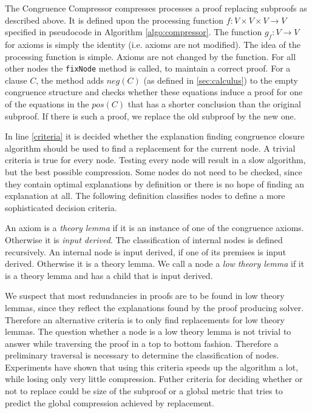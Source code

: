 The Congruence Compressor compresses processes a proof replacing subproofs as described above. 
It is defined upon the processing function $f: V \times V \times V \rightarrow V$ specified in pseudocode in Algorithm \ref{algo:compressor}.
The function $g_f: V \rightarrow V$ for axioms is simply the identity (i.e. axioms are not modified).
The idea of the processing function is simple.
Axioms are not changed by the function.
For all other nodes the \texttt{fixNode} method is called, to maintain a correct proof.
For a clause $C$, the method adds $neg(C)$ (as defined in \ref{sec:calculus}) to the empty congruence structure and checks whether these equations induce a proof for one of the equations in the $pos(C)$ that has a shorter conclusion than the original subproof.
If there is such a proof, we replace the old subproof by the new one.

In line \ref{criteria} it is decided whether the explanation finding congruence closure algorithm should be used to find a replacement for the current node.
A trivial criteria is true for every node.
Testing every node will result in a slow algorithm, but the best possible compression.
Some nodes do not need to be checked, since they contain optimal explanations by definition or there is no hope of finding an explanation at all.
The following definition classifies nodes to define a more sophisticated decision criteria.

\begin{definition}

An axiom is a \emph{theory lemma} if it is an instance of one of the congruence axioms.
Otherwise it is \emph{input derived}.
The classification of internal nodes is defined recursively.
An internal node is input derived, if one of its premises is input derived.
Otherwise it is a theory lemma.
We call a node a \emph{low theory lemma} if it is a theory lemma and has a child that is input derived.

\end{definition}

We suspect that most redundancies in proofs are to be found in low theory lemmas, since they reflect the explanations found by the proof producing solver.
Therefore an alternative criteria is to only find replacements for low theory lemmas.
The question whether a node is a low theory lemma is not trivial to answer while traversing the proof in a top to bottom fashion.
Therefore a preliminary traversal is necessary to determine the classification of nodes.
Experiments have shown that using this criteria speeds up the algorithm a lot, while losing only very little compression.
Futher criteria for deciding whether or not to replace could be size of the subproof or a global metric that tries to predict the global compression achieved by replacement.

